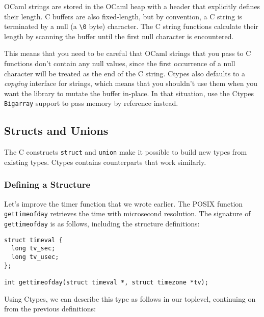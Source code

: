 OCaml strings are stored in the OCaml heap with a header that explicitly
defines their length. C buffers are also fixed-length, but by
convention, a C string is terminated by a null (a
\passthrough{\lstinline!\\0!} byte) character. The C string functions
calculate their length by scanning the buffer until the first null
character is encountered.

This means that you need to be careful that OCaml strings that you pass
to C functions don't contain any null values, since the first occurrence
of a null character will be treated as the end of the C string. Ctypes
also defaults to a \emph{copying} interface for strings, which means
that you shouldn't use them when you want the library to mutate the
buffer in-place. In that situation, use the Ctypes
\passthrough{\lstinline!Bigarray!} support to pass memory by reference
instead.

\hypertarget{structs-and-unions}{%
\subsection{Structs and Unions}\label{structs-and-unions}}

The C constructs \passthrough{\lstinline!struct!} and
\passthrough{\lstinline!union!} make it possible to build new types from
existing types. Ctypes contains counterparts that work
similarly.

\hypertarget{defining-a-structure}{%
\subsubsection{Defining a Structure}\label{defining-a-structure}}

Let's improve the timer function that we wrote earlier. The POSIX
function \passthrough{\lstinline!gettimeofday!} retrieves the time with
microsecond resolution. The signature of
\passthrough{\lstinline!gettimeofday!} is as follows, including the
structure definitions:

\begin{lstlisting}
struct timeval {
  long tv_sec;
  long tv_usec;
};

int gettimeofday(struct timeval *, struct timezone *tv);
\end{lstlisting}

Using Ctypes, we can describe this type as follows in our toplevel,
continuing on from the previous definitions:

